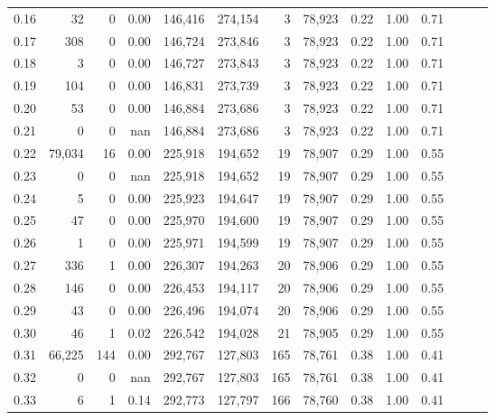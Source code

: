 \begin{tabular}{rrrrrrrrrrrrrr}
0.16 &      32 &       0 &  0.00 &  146,416 &  274,154 &       3 &  78,923 &  0.22 &  1.00 &      0.71 \\
0.17 &     308 &       0 &  0.00 &  146,724 &  273,846 &       3 &  78,923 &  0.22 &  1.00 &      0.71 \\
0.18 &       3 &       0 &  0.00 &  146,727 &  273,843 &       3 &  78,923 &  0.22 &  1.00 &      0.71 \\
0.19 &     104 &       0 &  0.00 &  146,831 &  273,739 &       3 &  78,923 &  0.22 &  1.00 &      0.71 \\
0.20 &      53 &       0 &  0.00 &  146,884 &  273,686 &       3 &  78,923 &  0.22 &  1.00 &      0.71 \\
0.21 &       0 &       0 &   nan &  146,884 &  273,686 &       3 &  78,923 &  0.22 &  1.00 &      0.71 \\
0.22 &  79,034 &      16 &  0.00 &  225,918 &  194,652 &      19 &  78,907 &  0.29 &  1.00 &      0.55 \\
0.23 &       0 &       0 &   nan &  225,918 &  194,652 &      19 &  78,907 &  0.29 &  1.00 &      0.55 \\
0.24 &       5 &       0 &  0.00 &  225,923 &  194,647 &      19 &  78,907 &  0.29 &  1.00 &      0.55 \\
0.25 &      47 &       0 &  0.00 &  225,970 &  194,600 &      19 &  78,907 &  0.29 &  1.00 &      0.55 \\
0.26 &       1 &       0 &  0.00 &  225,971 &  194,599 &      19 &  78,907 &  0.29 &  1.00 &      0.55 \\
0.27 &     336 &       1 &  0.00 &  226,307 &  194,263 &      20 &  78,906 &  0.29 &  1.00 &      0.55 \\
0.28 &     146 &       0 &  0.00 &  226,453 &  194,117 &      20 &  78,906 &  0.29 &  1.00 &      0.55 \\
0.29 &      43 &       0 &  0.00 &  226,496 &  194,074 &      20 &  78,906 &  0.29 &  1.00 &      0.55 \\
0.30 &      46 &       1 &  0.02 &  226,542 &  194,028 &      21 &  78,905 &  0.29 &  1.00 &      0.55 \\
0.31 &  66,225 &     144 &  0.00 &  292,767 &  127,803 &     165 &  78,761 &  0.38 &  1.00 &      0.41 \\
0.32 &       0 &       0 &   nan &  292,767 &  127,803 &     165 &  78,761 &  0.38 &  1.00 &      0.41 \\
0.33 &       6 &       1 &  0.14 &  292,773 &  127,797 &     166 &  78,760 &  0.38 &  1.00 &      0.41 \\

\end{tabular}
